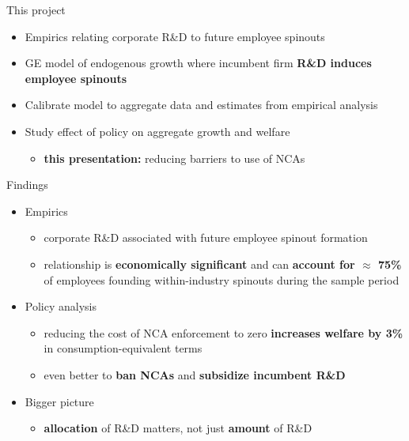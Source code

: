 \documentclass[english,usenames,dvipsnames]{beamer}
\begin{document}
\begin{frame}{This project}
\begin{itemize}
	\item Empirics relating corporate R\&D to future employee spinouts
	\smallskip
	\item GE model of endogenous growth where incumbent firm \alert{\textbf{R\&D induces employee spinouts}}
	\smallskip
	\item Calibrate model to aggregate data and estimates from empirical analysis
	\smallskip
	\item Study effect of policy on aggregate growth and welfare
	\begin{itemize}
		\item \alert{\textbf{this presentation:}} reducing barriers to use of NCAs
	\end{itemize}
\end{itemize}
\end{frame}

\begin{frame}{Findings}\label{intro_findings}
	\begin{itemize}
		\item<+-> Empirics
		\begin{itemize}
			\item corporate R\&D associated with future employee spinout formation
			\item relationship is \alert{\textbf{economically significant}} and can \alert{\textbf{account for $\approx$ 75\%}} of employees founding within-industry spinouts during the sample period
		\end{itemize}
		\medskip
		\item<+-> Policy analysis
		\begin{itemize}
			\item reducing the cost of NCA enforcement to zero \alert{\textbf{increases welfare by 3\%}} in consumption-equivalent terms
			\item even better to \alert{\textbf{ban NCAs}} and \alert{\textbf{subsidize incumbent R\&D}} 
		\end{itemize}
		\medskip
		\item<+-> Bigger picture
		\begin{itemize}
			\item \alert{\textbf{allocation}} of R\&D matters, not just \alert{\textbf{amount}} of R\&D
		\end{itemize}
	\end{itemize}
\end{frame}
\end{document}
